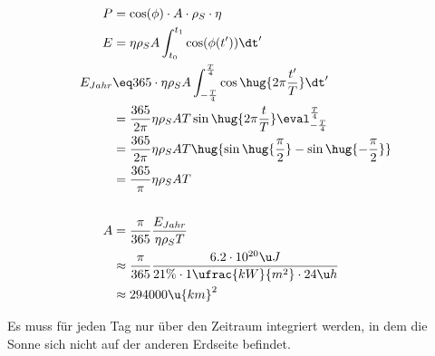 \documentclass[11pt, german]{article}
\begin{document}
\subsection{}
\begin{align*}
    P &= \cos(\phi)\cdot A \cdot \rho_S \cdot\eta\\
    E &= \eta \rho_S A \int_{t_0}^{t_1} \cos(\phi(t')) \dt'\\
    E_{Jahr} &\eq 365 \cdot \eta \rho_S A \int_{-\frac T4}^{\frac T4} \cos\hug{2\pi\frac{t'}{T}} \dt'\\
    &= \frac{365}{2\pi} \eta \rho_S A T \sin\hug{2\pi\frac{t}{T}} \eval_{-\frac T4}^{\frac T4}\\
    &= \frac{365}{2\pi} \eta \rho_S A T \hug{\sin\hug{\frac\pi2} - \sin\hug{-\frac\pi2}}\\
    &= \frac{365}{\pi} \eta \rho_S A T\\
    \\
    A &= \frac{\pi}{365}\frac{ E_{Jahr}}{ \eta\rho_S T}\\
    &\approx \frac{\pi}{365}\frac{6.2\cdot 10^{20}\u J }{21 \% \cdot 1\ufrac{kW}{m^2} \cdot 24\u h}\\
    &\approx 294000\u{km}^2
\end{align*}
\begin{adjustwidth}{20pt}{}
    \con Es muss für jeden Tag nur über den Zeitraum integriert werden,
    in dem die Sonne sich nicht auf der anderen Erdseite befindet. 
\end{adjustwidth} 
\end{document}
